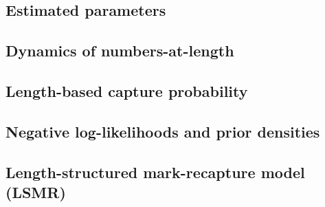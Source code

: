 
\subsection{Estimated parameters} %
\label{sub:estimated_parameters}


\subsection{Dynamics of numbers-at-length} %
\label{sub:dynamics_of_numbers_at_length}


\subsection{Length-based capture probability} %
\label{sub:length_based_capture_probability}


\subsection{Negative log-likelihoods and prior densities} %
\label{sub:negative_log_likelihoods_and_prior_densities}


\subsection{Length-structured mark-recapture model (LSMR)}






